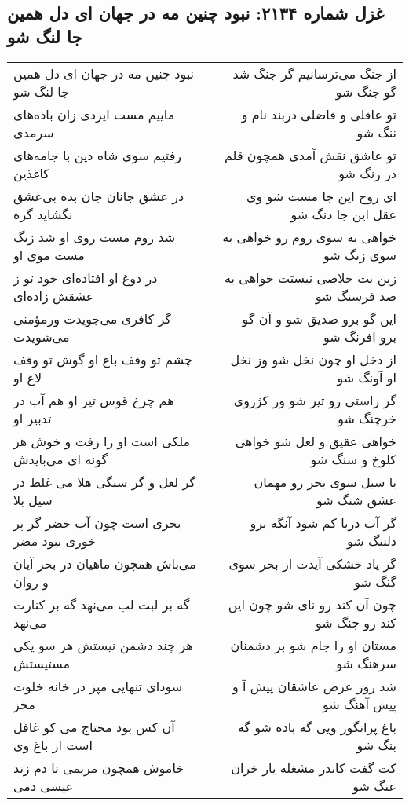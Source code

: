 \begin{center}
\section*{غزل شماره ۲۱۳۴: نبود چنین مه در جهان ای دل همین جا لنگ شو}
\label{sec:2134}
\begin{longtable}{l p{0.5cm} r}
نبود چنین مه در جهان ای دل همین جا لنگ شو
&&
از جنگ می‌ترسانیم گر جنگ شد گو جنگ شو
\\
ماییم مست ایزدی زان باده‌های سرمدی
&&
تو عاقلی و فاضلی دربند نام و ننگ شو
\\
رفتیم سوی شاه دین با جامه‌های کاغذین
&&
تو عاشق نقش آمدی همچون قلم در رنگ شو
\\
در عشق جانان جان بده بی‌عشق نگشاید گره
&&
ای روح این جا مست شو وی عقل این جا دنگ شو
\\
شد روم مست روی او شد زنگ مست موی او
&&
خواهی به سوی روم رو خواهی به سوی زنگ شو
\\
در دوغ او افتاده‌ای خود تو ز عشقش زاده‌ای
&&
زین بت خلاصی نیستت خواهی به صد فرسنگ شو
\\
گر کافری می‌جویدت ورمؤمنی می‌شویدت
&&
این گو برو صدیق شو و آن گو برو افرنگ شو
\\
چشم تو وقف باغ او گوش تو وقف لاغ او
&&
از دخل او چون نخل شو وز نخل او آونگ شو
\\
هم چرخ قوس تیر او هم آب در تدبیر او
&&
گر راستی رو تیر شو ور کژروی خرچنگ شو
\\
ملکی است او را زفت و خوش هر گونه ای می‌بایدش
&&
خواهی عقیق و لعل شو خواهی کلوخ و سنگ شو
\\
گر لعل و گر سنگی هلا می غلط در سیل بلا
&&
با سیل سوی بحر رو مهمان عشق شنگ شو
\\
بحری است چون آب خضر گر پر خوری نبود مضر
&&
گر آب دریا کم شود آنگه برو دلتنگ شو
\\
می‌باش همچون ماهیان در بحر آیان و روان
&&
گر یاد خشکی آیدت از بحر سوی گنگ شو
\\
گه بر لبت لب می‌نهد گه بر کنارت می‌نهد
&&
چون آن کند رو نای شو چون این کند رو چنگ شو
\\
هر چند دشمن نیستش هر سو یکی مستیستش
&&
مستان او را جام شو بر دشمنان سرهنگ شو
\\
سودای تنهایی مپز در خانه خلوت مخز
&&
شد روز عرض عاشقان پیش آ و پیش آهنگ شو
\\
آن کس بود محتاج می کو غافل است از باغ وی
&&
باغ پرانگور ویی گه باده شو گه بنگ شو
\\
خاموش همچون مریمی تا دم زند عیسی دمی
&&
کت گفت کاندر مشغله یار خران عنگ شو
\\
\end{longtable}
\end{center}
